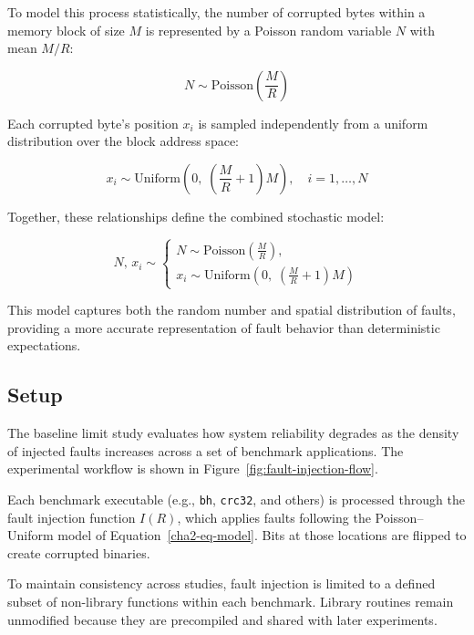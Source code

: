 To model this process statistically, the number of corrupted bytes within a memory block 
of size $M$ is represented by a Poisson random variable $N$ with mean $M / R$:

\begin{equation}
N \sim \mathrm{Poisson}\left(\frac{M}{R}\right)
\end{equation}

Each corrupted byte’s position $x_i$ is sampled independently from a uniform distribution 
over the block address space:

\begin{equation}
x_i \sim \mathrm{Uniform}\left(0,\; \left(\frac{M}{R}+1\right)M \right), \quad i = 1, \ldots, N
\end{equation}

Together, these relationships define the combined stochastic model:

\begin{equation}
N,\, x_i \sim 
\begin{cases}
N \sim \mathrm{Poisson}\left(\frac{M}{R}\right),\\[4pt]
x_i \sim \mathrm{Uniform}\left(0,\; \left(\frac{M}{R}+1\right)M \right)
\end{cases}
\label{cha2-eq-model}
\end{equation}

This model captures both the random number and spatial distribution of faults, 
providing a more accurate representation of fault behavior than deterministic expectations.

\subsection{Setup}
\label{subsec:baseline-setup}

The baseline limit study evaluates how system reliability degrades as the density of injected faults 
increases across a set of benchmark applications. 
The experimental workflow is shown in Figure~\ref{fig:fault-injection-flow}.  

Each benchmark executable (e.g., \texttt{bh}, \texttt{crc32}, and others) is processed 
through the fault injection function $I(R)$, which applies faults following the 
Poisson--Uniform model of Equation~\ref{cha2-eq-model}. 
Bits at those locations are flipped to create corrupted binaries.  

To maintain consistency across studies, fault injection is limited to a defined subset of 
non-library functions within each benchmark. Library routines remain unmodified because they 
are precompiled and shared with later experiments.  


